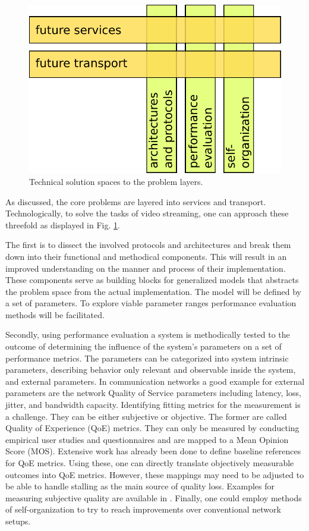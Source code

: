 \begin{figure}[htbp]
    \centering
    \includegraphics[width=.8\textwidth]{images/hv-topics-new.pdf}
    \caption{Technical solution spaces to the problem layers.}
    \label{c1:fig:hv-topics}
\end{figure}

As discussed, the core problems are layered into services and transport. Technologically, to solve the tasks of video streaming, one can approach these  threefold as displayed in Fig. \ref{c1:fig:hv-topics}.

The first is to dissect the involved protocols and architectures and break them down into their functional and methodical components. This will result in an improved understanding on the manner and process of their implementation. These components serve as building blocks for generalized models that abstracts the problem space from the actual implementation. The model will be defined by a set of parameters. To explore viable parameter ranges performance evaluation methods will be facilitated.


Secondly, using performance evaluation a system is methodically tested to the outcome of determining the influence of the system's parameters on a set of performance metrics. The parameters can be categorized into system intrinsic parameters, describing behavior only relevant and observable inside the system, and external parameters. In communication networks a good example for external parameters are the network Quality of Service parameters including latency, loss, jitter, and bandwidth capacity. Identifying fitting metrics for the measurement is a challenge. They can be either subjective or objective. The former are called Quality of Experience (QoE) metrics. They can only be measured by conducting empirical user studies and questionnaires and are mapped to a Mean Opinion Score (MOS). Extensive work has already been done to define baseline references for QoE metrics. Using these, one can directly translate objectively measurable outcomes into QoE metrics. However, these mappings may need to be adjusted to be able to handle stalling as the main source of quality loss. Examples for measuring subjective quality are available in \cite{gustafsson2008measuring, ketyo2010qoe}. 
Finally, one could employ methods of self-organization to try to reach improvements over conventional network setups.


